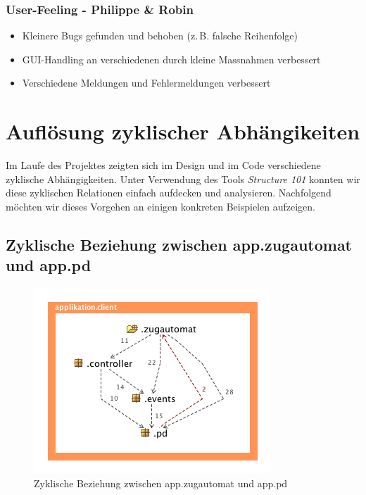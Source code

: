 \documentclass[12pt,halfparskip]{scrartcl}
\begin{document}

\subsubsection{User-Feeling - Philippe \& Robin}
\label{ssub:user_feeling_philippe_amp_robin}

\begin{itemize}
	\item Kleinere Bugs gefunden und behoben (z.\,B. falsche Reihenfolge)
	\item GUI-Handling an verschiedenen durch kleine Massnahmen verbessert
	\item Verschiedene Meldungen und Fehlermeldungen verbessert
\end{itemize}


\section{Auflösung zyklischer Abhängikeiten}
Im Laufe des Projektes zeigten sich im Design und im Code verschiedene zyklische Abhängigkeiten. Unter Verwendung des Tools \emph{Structure 101} konnten wir diese zyklischen Relationen einfach aufdecken und analysieren. Nachfolgend möchten wir dieses Vorgehen an einigen konkreten Beispielen aufzeigen.

\subsection{Zyklische Beziehung zwischen app.zugautomat und app.pd}

\begin{figure}[h]
	\centering
	\includegraphics[width=0.5 \textwidth]{../design/probleme/zugautomat-client-pd}
	\caption{Zyklische Beziehung zwischen app.zugautomat und app.pd}
	\label{fig:zugautomat-client-pd}
\end{figure}
\end{document}
